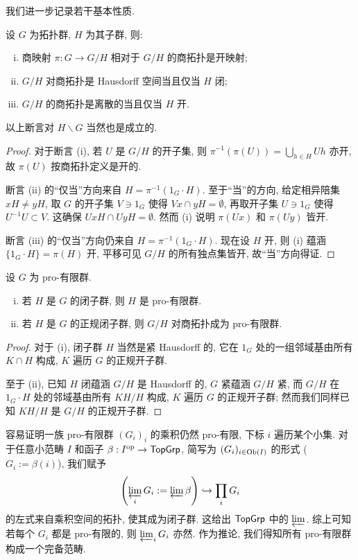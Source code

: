 我们进一步记录若干基本性质.

\begin{lemma}
	设 $G$ 为拓扑群, $H$ 为其子群, 则:
	\begin{enumerate}[(i)]
		\item 商映射 $\pi: G \to G/H$ 相对于 $G/H$ 的商拓扑是开映射;
		\item $G/H$ 对商拓扑是 Hausdorff 空间当且仅当 $H$ 闭;
		\item $G/H$ 的商拓扑是离散的当且仅当 $H$ 开.
	\end{enumerate}
	以上断言对 $H \backslash G$ 当然也是成立的.
\end{lemma}
\begin{proof}
	对于断言 (i), 若 $U$ 是 $G/H$ 的开子集, 则 $\pi^{-1}(\pi(U)) = \bigcup_{h \in H} Uh$ 亦开, 故 $\pi(U)$ 按商拓扑定义是开的.
	
	断言 (ii) 的``仅当''方向来自 $H = \pi^{-1}(1_G \cdot H)$. 至于``当''的方向, 给定相异陪集 $xH \neq yH$, 取 $G$ 的开子集 $V \ni 1_G$ 使得 $Vx \cap yH = \emptyset$, 再取开子集 $U \ni 1_G$ 使得 $U^{-1} U \subset V$. 这确保 $UxH \cap UyH = \emptyset$. 然而 (i) 说明 $\pi(Ux)$ 和 $\pi(Uy)$ 皆开.
	
	断言 (iii) 的``仅当''方向仍来自 $H = \pi^{-1}(1_G \cdot H)$. 现在设 $H$ 开, 则 (i) 蕴涵 $\{1_G \cdot H \} = \pi(H)$ 开, 平移可见 $G/H$ 的所有独点集皆开, 故``当''方向得证.
\end{proof}

\begin{proposition}
	设 $G$ 为 pro-有限群.
	\begin{enumerate}[(i)]
		\item 若 $H$ 是 $G$ 的闭子群, 则 $H$ 是 pro-有限群.
		\item 若 $H$ 是 $G$ 的正规闭子群, 则 $G/H$ 对商拓扑成为 pro-有限群.
	\end{enumerate}
\end{proposition}
\begin{proof}
	对于 (i), 闭子群 $H$ 当然是紧 Hausdorff 的, 它在 $1_G$ 处的一组邻域基由所有 $K \cap H$ 构成, $K$ 遍历 $G$ 的正规开子群.
	
	至于 (ii), 已知 $H$ 闭蕴涵 $G/H$ 是 Hausdorff 的, $G$ 紧蕴涵 $G/H$ 紧, 而 $G/H$ 在 $1_G \cdot H$ 处的邻域基由所有 $KH/H$ 构成, $K$ 遍历 $G$ 的正规开子群; 然而我们同样已知 $KH/H$ 是 $G/H$ 的正规开子群.
\end{proof}

容易证明一族 pro-有限群 $(G_i)_i$ 的乘积仍然 pro-有限, 下标 $i$ 遍历某个小集. 对于任意小范畴 $I$ 和函子 $\beta: I^{\operatorname{op}} \to \mathsf{TopGrp}$, 简写为 $(G_i)_{i \in \operatorname{Ob}(I)}$ 的形式 ($G_i := \beta(i)$), 我们赋予
\[ \left( \varprojlim_i G_i := \varprojlim \beta \right) \hookrightarrow \prod_i G_i \]
的左式来自乘积空间的拓扑, 使其成为闭子群. 这给出 $\mathsf{TopGrp}$ 中的 $\varprojlim$. 综上可知若每个 $G_i$ 都是 pro-有限的, 则 $\varprojlim_i G_i$ 亦然. 作为推论, 我们得知所有 pro-有限群构成一个完备范畴.

